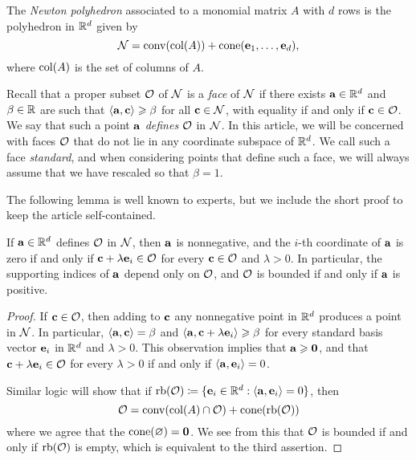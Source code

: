 \documentclass[11pt]{amsart}
\begin{document}
The \emph{Newton polyhedron} associated to a monomial matrix $A$ with $d$ rows is the polyhedron in $\mathbb{R}^d$ given by 
\[ \mathcal{N} = \operatorname{conv}( \operatorname{col}(A) ) + \operatorname{cone}( \mathbf{e}_1, \ldots, \mathbf{e}_d), \]
where $\operatorname{col}(A)$ is the set of columns of $A$.  

Recall that a proper  subset $\mathcal{O}$ of $\mathcal{N}$ is a \emph{face} of $\mathcal{N}$  if there exists $\mathbf{a} \in \mathbb{R}^d$ and $\beta \in \mathbb{R}$ are such that $\langle \mathbf{a}, \mathbf{c} \rangle \geqslant \beta$ for all $\mathbf{c} \in \mathcal{N}$, with equality if and only if $\mathbf{c} \in \mathcal{O}$.  We say that  such a point $\mathbf{a}$ \emph{defines} $\mathcal{O}$ in $\mathcal{N}$.    In this article, we will be concerned with faces $\mathcal{O}$ that do not lie in any coordinate subspace of $\mathbb{R}^d$.  We call such a face \emph{standard}, and when considering points that define such a face, we will always assume that we have rescaled so that $\beta = 1$. 

The following lemma is well known to experts, but we include the short proof to keep the article self-contained.

\begin{lemma} 
\label{face: L}
If $\mathbf{a} \in \mathbb{R}^d$ defines $\mathcal{O}$ in $\mathcal{N}$, then $\mathbf{a}$ is nonnegative, and the $i$-th coordinate of $\mathbf{a}$ is zero if and only if $\mathbf{c} + \lambda \mathbf{e}_i \in \mathcal{O}$  for every $\mathbf{c} \in \mathcal{O}$ and $\lambda > 0$.  In particular, the supporting indices of $\mathbf{a}$ depend only on $\mathcal{O}$, and $\mathcal{O}$ is bounded if and only if $\mathbf{a}$ is positive. 
\end{lemma}

\begin{proof}  If $\mathbf{c} \in \mathcal{O}$, then adding to $\mathbf{c}$ any nonnegative point in $\mathbb{R}^d$ produces a point in $\mathcal{N}$.  In particular, $\langle \mathbf{a}, \mathbf{c} \rangle = \beta$ and $\langle \mathbf{a}, \mathbf{c} + \lambda \mathbf{e}_i \rangle \geqslant \beta$ for every standard basis vector $\mathbf{e}_i$ in $\mathbb{R}^d$ and $\lambda > 0$.  This observation implies that $\mathbf{a} \geqslant \mathbf{0}$, and that $\mathbf{c} + \lambda \mathbf{e}_i \in \mathcal{O}$ for every $\lambda > 0$ if and only if $\langle \mathbf{a}, \mathbf{e}_i \rangle = 0$.  

Similar logic will show that if $\operatorname{rb}(\mathcal{O}) \coloneqq  \{ \mathbf{e}_i \in \mathbb{R}^d : \langle \mathbf{a}, \mathbf{e}_i \rangle = 0\}$, then 
\begin{equation}
\label{face: e}
\mathcal{O} =  \operatorname{conv}( \operatorname{col}(A) \cap \mathcal{O} ) + \operatorname{cone}(\operatorname{rb}(\mathcal{O}))
\end{equation}
where we agree that the $\operatorname{cone}(\varnothing) = \mathbf{0}$.  We see from this that $\mathcal{O}$ is bounded if and only if $\operatorname{rb}(\mathcal{O})$ is empty, which is equivalent to the third assertion.  
\end{proof}
\end{document}
